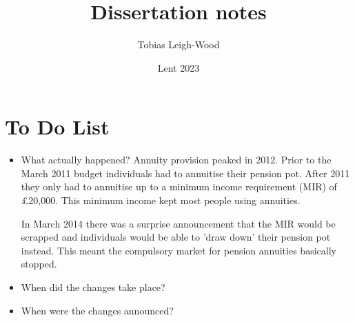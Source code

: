\documentclass[12pt]{article}
\date{Lent 2023}
\title{Dissertation notes}
\author{Tobias Leigh-Wood}
\begin{document}
\maketitle

\section*{To Do List}
\begin{itemize}
    \item What actually happened?
          Annuity provision peaked in 2012. Prior to the March 2011 budget individuals had to annuitise their pension pot.
          After 2011 they only had to annuitise up to a minimum income requirement (MIR) of £20,000. This minimum income kept most people using annuities.

          In March 2014 there was a surprise announcement that the MIR would be scrapped and individuals would be able to 'draw down' their pension pot instead.
          This meant the compulsory market for pension annuities basically stopped.

    \item When did the changes take place?
    \item When were the changes announced?
\end{itemize}
\end{document}

